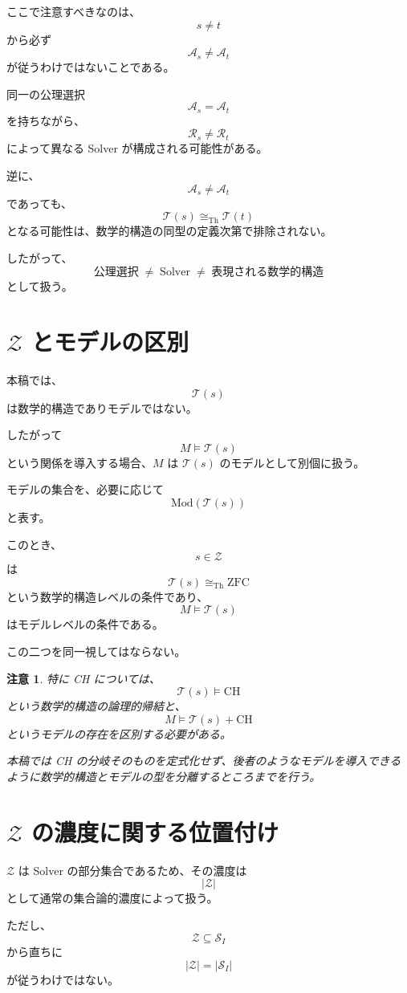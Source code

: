 \documentclass[a4paper,11pt]{article}
\newtheorem{remark}[definition]{注意}
\newcommand{\Solver}{\mathcal{S}}
\begin{document}
ここで注意すべきなのは、
\[
s\neq t
\]
から必ず
\[
\mathcal{A}_s\neq\mathcal{A}_t
\]
が従うわけではないことである。

同一の公理選択
\[
\mathcal{A}_s=\mathcal{A}_t
\]
を持ちながら、
\[
\mathcal{R}_s\neq\mathcal{R}_t
\]
によって異なる Solver が構成される可能性がある。

逆に、
\[
\mathcal{A}_s\neq\mathcal{A}_t
\]
であっても、
\[
\mathcal{T}(s)\cong_{\mathrm{Th}}\mathcal{T}(t)
\]
となる可能性は、数学的構造の同型の定義次第で排除されない。

したがって、
\[
\boxed{
\text{公理選択}
\;\neq\;
\text{Solver}
\;\neq\;
\text{表現される数学的構造}
}
\]
として扱う。

\section{$\mathcal{Z}$ とモデルの区別}

本稿では、
\[
\mathcal{T}(s)
\]
は数学的構造でありモデルではない。

したがって
\[
M\models\mathcal{T}(s)
\]
という関係を導入する場合、$M$ は
$\mathcal{T}(s)$ のモデルとして別個に扱う。

モデルの集合を、必要に応じて
\[
\boxed{
\mathrm{Mod}(\mathcal{T}(s))
}
\]
と表す。

このとき、
\[
s\in\mathcal{Z}
\]
は
\[
\mathcal{T}(s)\cong_{\mathrm{Th}}\mathrm{ZFC}
\]
という数学的構造レベルの条件であり、
\[
M\models\mathcal{T}(s)
\]
はモデルレベルの条件である。

この二つを同一視してはならない。

\begin{remark}
特に CH については、
\[
\mathcal{T}(s)\models\mathrm{CH}
\]
という数学的構造の論理的帰結と、
\[
M\models\mathcal{T}(s)+\mathrm{CH}
\]
というモデルの存在を区別する必要がある。

本稿では CH の分岐そのものを定式化せず、後者のようなモデルを導入できるように数学的構造とモデルの型を分離するところまでを行う。
\end{remark}

\section{$\mathcal{Z}$ の濃度に関する位置付け}

$\mathcal{Z}$ は Solver の部分集合であるため、その濃度は
\[
|\mathcal{Z}|
\]
として通常の集合論的濃度によって扱う。

ただし、
\[
\mathcal{Z}
\subseteq
\Solver_I
\]
から直ちに
\[
|\mathcal{Z}|=|\Solver_I|
\]
が従うわけではない。
\end{document}
